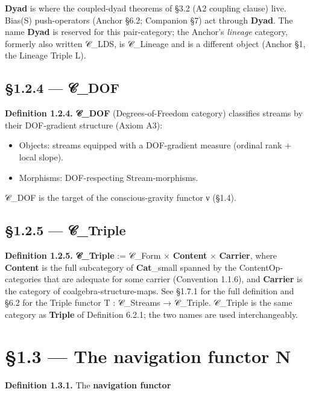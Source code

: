 \documentclass[11pt, openany]{book}
\newcommand{\sectionbreak}{\clearpage}
\begin{document}
\textbf{Dyad} is where the coupled-dyad theorems of §3.2 (A2 coupling clause) live. Bias(S) push-operators (Anchor §6.2; Companion §7) act through \textbf{Dyad}. The name \textbf{Dyad} is reserved for this pair-category; the Anchor's \textit{lineage} category, formerly also written 𝒞\_\allowbreak{}LDS, is 𝒞\_\allowbreak{}Lineage and is a different object (Anchor §1, the Lineage Triple L).

\subsection{§1.2.4 --- 𝒞\_\allowbreak{}DOF}

\textbf{Definition 1.2.4.} \textbf{𝒞\_\allowbreak{}DOF} (Degrees-of-Freedom category) classifies streams by their DOF-gradient structure (Axiom A3):
\begin{itemize}
\item Objects: streams equipped with a DOF-gradient measure (ordinal rank + local slope).
\item Morphisms: DOF-respecting Stream-morphisms.
\end{itemize}

𝒞\_\allowbreak{}DOF is the target of the conscious-gravity functor ν (§1.4).

\subsection{§1.2.5 --- 𝒞\_\allowbreak{}Triple}

\textbf{Definition 1.2.5.} \textbf{𝒞\_\allowbreak{}Triple} := 𝒞\_\allowbreak{}Form × \textbf{Content} × \textbf{Carrier}, where \textbf{Content} is the full subcategory of \textbf{Cat}\_\allowbreak{}small spanned by the ContentOp-categories that are adequate for some carrier (Convention 1.1.6), and \textbf{Carrier} is the category of coalgebra-structure-maps. See §1.7.1 for the full definition and §6.2 for the Triple functor T : 𝒞\_\allowbreak{}Streams → 𝒞\_\allowbreak{}Triple. 𝒞\_\allowbreak{}Triple is the same category as \textbf{Triple} of Definition 6.2.1; the two names are used interchangeably.

\sectionbreak

\section{§1.3 --- The navigation functor N}

\textbf{Definition 1.3.1.} The \textbf{navigation functor}
\end{document}
